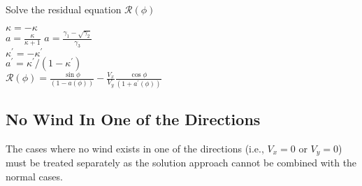 \begin{algorithm}[htbp]
\caption{Solve the residual equation $\mathcal{R}(\phi)$}
\begin{algorithmic}

    \State $\kappa = -\kappa$
\EndIf
\\
    \State $a = \frac{\kappa}{\kappa + 1}$
\Else
    \State $a = \frac{\gamma_1 - \sqrt{\gamma_2}}{\gamma_3}$
\EndIf
\\
    \State $\kappa^\prime = -\kappa^\prime$
\EndIf
\\
\State $a^\prime = \kappa^\prime/(1 - \kappa^\prime)$
\\
\State $\mathcal{R}(\phi) = \frac{\sin\phi}{(1 - a(\phi))} - \frac{V_x}{V_y} \frac{\cos\phi}{(1 + a^\prime(\phi))}$
\end{algorithmic}
\label{alg:aap}
\end{algorithm}

\subsection{No Wind In One of the Directions}

The cases where no wind exists in one of the directions (i.e., $V_x = 0$ or $V_y = 0$) must be treated separately as the solution approach cannot be combined with the normal cases.

